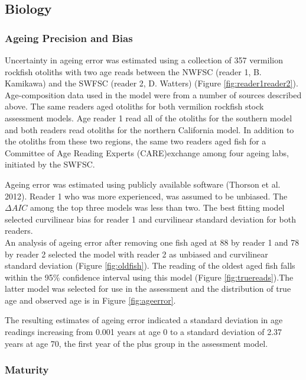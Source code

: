 \documentclass[
  english,
  a4paper,
]{article}
\begin{document}
\hypertarget{biology}{%
\subsection{Biology}\label{biology}}

\hypertarget{ageing-precision-and-bias}{%
\subsubsection{Ageing Precision and Bias}\label{ageing-precision-and-bias}}

Uncertainty in ageing error was estimated using a collection of 357 vermilion rockfish
otoliths with two age reads between the NWFSC (reader 1, B. Kamikawa) and the
SWFSC (reader 2, D. Watters) (Figure \ref{fig:reader1reader2}).
Age-composition data used in the model were from a number of sources described
above. The same readers aged otoliths for both vermilion rockfish stock assessment models.
Age reader 1 read all of the otoliths for the southern model and both readers read
otoliths for the northern California model. In addition to the otoliths from these
two regions, the same two readers aged fish for a Committee of Age Reading Experts
(CARE)exchange among four ageing labs, initiated by the SWFSC.

Ageing error was estimated using publicly available software (Thorson et al. 2012).
Reader 1 who was more
experienced, was assumed to be unbiased. The \(\Delta AIC\) among the top three models was less than two. The
best fitting model selected curvilinear bias for reader 1 and curvilinear standard
deviation for both readers.\\
An analysis of ageing error after removing one fish aged at 88 by reader 1 and 78 by reader 2
selected the model with reader 2 as unbiased and curvilinear standard deviation
(Figure \ref{fig:oldfish}). The reading of the oldest aged fish falls within the 95\% confidence
interval using this model (Figure \ref{fig:truereads}).The latter model was selected
for use in the assessment and the distribution of true age and observed
age is in Figure \ref{fig:ageerror}.

The resulting estimates of ageing error indicated a standard deviation in age readings
increasing from 0.001 years at age 0 to a standard deviation of 2.37 years at age 70,
the first year of the plus group in the assessment model.

\hypertarget{maturity}{%
\subsubsection{Maturity}\label{maturity}}
\end{document}
